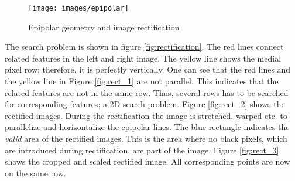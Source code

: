 \documentclass[11pt]{article}
\begin{document}
 \begin{figure}[H]
        \centering
        \texttt{[image: images/epipolar]}
        \caption{Epipolar geometry and image rectification\protect\footnotemark}
        \label{fig:epipolar}
\end{figure}

The search problem is shown in figure \ref{fig:rectification}. The red lines connect related features in the left and right image. The yellow line shows the medial pixel row; therefore, it is perfectly vertically. One can see that the red lines and the yellow line in Figure \ref{fig:rect_1} are not parallel. This indicates that the related features are not in the same row. Thus, several rows has to be searched for corresponding features; a 2D search problem. Figure \ref{fig:rect_2} shows the rectified images. During the rectification the image is stretched, warped etc. to parallelize and horizontalize the epipolar lines. The blue rectangle indicates the \emph{valid} area of the rectified images. This is the area where no black pixels, which are introduced during rectification, are part of the image. Figure \ref{fig:rect_3} shows the cropped and scaled rectified image. All corresponding points are now on the same row.
\end{document}
